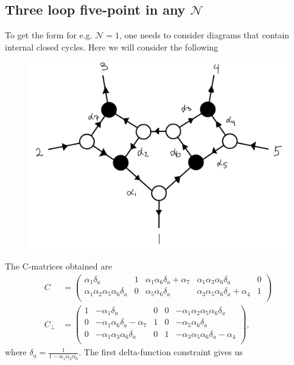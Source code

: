 \documentclass[letter,11pt]{article}
\begin{document}
\subsection{Three loop five-point in any $\mathcal{N}$}
To get the form for e.g. $\mathcal{N}=1$, one needs to consider diagrams that contain internal closed  cycles. Here we will consider the following
\begin{figure}[H]
	\centering
	\includegraphics[width=0.5\linewidth]{5pt3l_2}
	\caption{}
	\label{fig:5pt3l_3}
\end{figure}
The C-matrices obtained are
\begin{equation}
	\begin{aligned}
		C
		&=\left(
		\begin{array}{ccccc}
			\alpha _1 \delta_a & 1 & \alpha _1 \alpha _6 \delta_a+\alpha _7 & \alpha _1 \alpha _3 \alpha _6 \delta_a & 0 \\
			\alpha _1 \alpha _2 \alpha _5 \alpha _6 \delta_a & 0 & \alpha _5 \alpha _6 \delta_a & \alpha _3 \alpha _5 \alpha _6 \delta_a+\alpha _4 & 1 \\
		\end{array}
		\right)\\
		C_\perp&=
		\left(
		\begin{array}{ccccc}
			1 & -\alpha _1\delta_a & 0 & 0 & -\alpha _1 \alpha _2 \alpha _5 \alpha _6 \delta_a \\
0 & -\alpha _1 \alpha _6 \delta_a-\alpha _7 & 1 & 0 & -\alpha _5 \alpha _6 \delta_a \\
0 & -\alpha _1 \alpha _3 \alpha _6 \delta_a & 0 & 1 & -\alpha _3 \alpha _5 \alpha _6 \delta_a-\alpha _4 \\
		\end{array}
		\right),
	\end{aligned}
\end{equation}
where $\delta_a=\frac{1}{1-\alpha_1\alpha_2\alpha_6}$. The first delta-function constraint gives us
\end{document}

